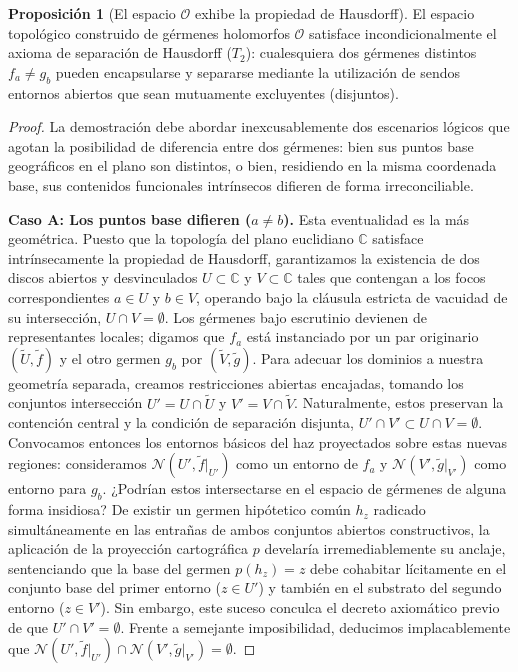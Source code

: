 \documentclass[11pt,a4paper]{article}
\theoremstyle{definition}
\newtheorem{proposicion}{Proposición}[section]
\theoremstyle{remark}
\numberwithin{equation}{section}
\begin{document}
\begin{proposicion}[El espacio $\mathcal{O}$ exhibe la propiedad de Hausdorff]
El espacio topológico construido de gérmenes holomorfos $\mathcal{O}$ satisface incondicionalmente el axioma de separación de Hausdorff ($T_2$): cualesquiera dos gérmenes distintos $f_a \neq g_b$ pueden encapsularse y separarse mediante la utilización de sendos entornos abiertos que sean mutuamente excluyentes (disjuntos).
\end{proposicion}
\begin{proof}
La demostración debe abordar inexcusablemente dos escenarios lógicos que agotan la posibilidad de diferencia entre dos gérmenes: bien sus puntos base geográficos en el plano son distintos, o bien, residiendo en la misma coordenada base, sus contenidos funcionales intrínsecos difieren de forma irreconciliable.

\textbf{Caso A: Los puntos base difieren ($a \neq b$).}
Esta eventualidad es la más geométrica. Puesto que la topología del plano euclidiano $\mathbb{C}$ satisface intrínsecamente la propiedad de Hausdorff, garantizamos la existencia de dos discos abiertos y desvinculados $U \subset \mathbb{C}$ y $V \subset \mathbb{C}$ tales que contengan a los focos correspondientes $a \in U$ y $b \in V$, operando bajo la cláusula estricta de vacuidad de su intersección, $U \cap V = \emptyset$.
Los gérmenes bajo escrutinio devienen de representantes locales; digamos que $f_a$ está instanciado por un par originario $(\widetilde{U}, \widetilde{f})$ y el otro germen $g_b$ por $(\widetilde{V}, \widetilde{g})$. Para adecuar los dominios a nuestra geometría separada, creamos restricciones abiertas encajadas, tomando los conjuntos intersección $U' = U \cap \widetilde{U}$ y $V' = V \cap \widetilde{V}$. Naturalmente, estos preservan la contención central y la condición de separación disjunta, $U' \cap V' \subset U \cap V = \emptyset$.
Convocamos entonces los entornos básicos del haz proyectados sobre estas nuevas regiones: consideramos $\mathcal{N}(U', \widetilde{f}|_{U'})$ como un entorno de $f_a$ y $\mathcal{N}(V', \widetilde{g}|_{V'})$ como entorno para $g_b$. ¿Podrían estos intersectarse en el espacio de gérmenes de alguna forma insidiosa? De existir un germen hipótetico común $h_z$ radicado simultáneamente en las entrañas de ambos conjuntos abiertos constructivos, la aplicación de la proyección cartográfica $p$ develaría irremediablemente su anclaje, sentenciando que la base del germen $p(h_z) = z$ debe cohabitar lícitamente en el conjunto base del primer entorno ($z \in U'$) y también en el substrato del segundo entorno ($z \in V'$). Sin embargo, este suceso conculca el decreto axiomático previo de que $U' \cap V' = \emptyset$. Frente a semejante imposibilidad, deducimos implacablemente que $\mathcal{N}(U', \widetilde{f}|_{U'}) \cap \mathcal{N}(V', \widetilde{g}|_{V'}) = \emptyset$.


\end{proof}
\end{document}
